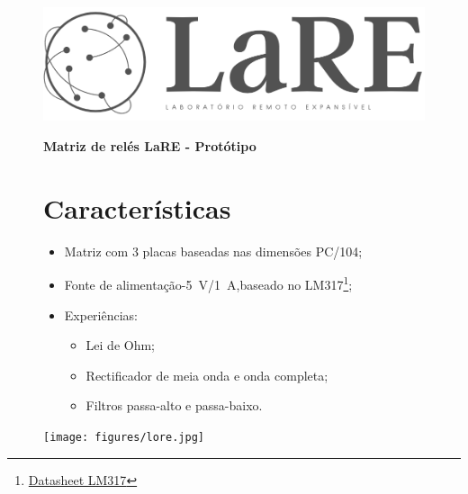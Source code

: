 \chead {\today}

\onecolumn

\begin{figure}
\begin{minipage}{0.47\textwidth}
\centering
\includegraphics[width=.7\textwidth,left,]{figures/logo.jpg}
\end{minipage}

\hfill
\begin{minipage}{0.47\textwidth}
\raggedleft
\Huge \textbf{Matriz de relés LaRE - Protótipo}
\end{minipage}
\end{figure}


\begin{figure}
\begin{minipage}{0.47\textwidth}

\section{Características}
\begin{itemize}
    \item Matriz com 3 placas baseadas nas dimensões PC/104;
    \item Fonte de alimentação-\SI{5}{\volt}/\SI{1}{\ampere},\newline baseado no LM317\footnote{\href{https://www.ti.com/lit/ds/symlink/lm317.pdf}{Datasheet LM317}};
    \item Experiências:
    \begin{itemize}
        \item Lei de Ohm;
        \item Rectificador de meia onda e onda completa;
        \item Filtros passa-alto e passa-baixo.
    \end{itemize}
\end{itemize}


\end{minipage}
\hfill
\begin{minipage}{0.47\textwidth}
\centering
\texttt{[image: figures/lore.jpg]}

\end{minipage}
\end{figure}

